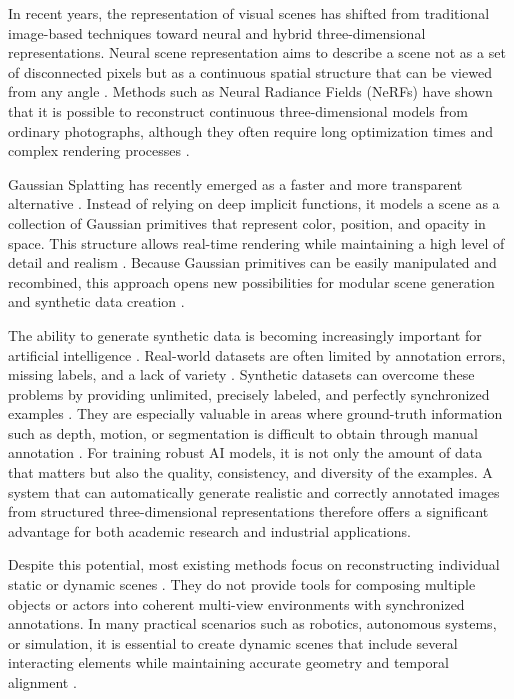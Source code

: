 In recent years, the representation of visual scenes has shifted from traditional image-based techniques toward neural and hybrid three-dimensional representations. Neural scene representation aims to describe a scene not as a set of disconnected pixels but as a continuous spatial structure that can be viewed from any angle \cite{mildenhall2021nerf}. Methods such as Neural Radiance Fields (NeRFs) have shown that it is possible to reconstruct continuous three-dimensional models from ordinary photographs, although they often require long optimization times and complex rendering processes \cite{barron2021mip}.

Gaussian Splatting has recently emerged as a faster and more transparent alternative \cite{kerbl3Dgaussians}. Instead of relying on deep implicit functions, it models a scene as a collection of Gaussian primitives that represent color, position, and opacity in space. This structure allows real-time rendering while maintaining a high level of detail and realism \cite{fridovich2023k}. Because Gaussian primitives can be easily manipulated and recombined, this approach opens new possibilities for modular scene generation and synthetic data creation \cite{CutAndSplat2024}.

The ability to generate synthetic data is becoming increasingly important for artificial intelligence \cite{tobin2017domain, denninger2019blenderproc}. Real-world datasets are often limited by annotation errors, missing labels, and a lack of variety \cite{dwibedi2017cutpaste}. Synthetic datasets can overcome these problems by providing unlimited, precisely labeled, and perfectly synchronized examples \cite{zanjani2025gaussian}. They are especially valuable in areas where ground-truth information such as depth, motion, or segmentation is difficult to obtain through manual annotation \cite{godard2017unsupervised, bertasius2019maskprop}.
For training robust AI models, it is not only the amount of data that matters but also the quality, consistency, and diversity of the examples. A system that can automatically generate realistic and correctly annotated images from structured three-dimensional representations therefore offers a significant advantage for both academic research and industrial applications.

Despite this potential, most existing methods focus on reconstructing individual static or dynamic scenes \cite{luiten2024dynamic,yang2024deformable}. They do not provide tools for composing multiple objects or actors into coherent multi-view environments with synchronized annotations. In many practical scenarios such as robotics, autonomous systems, or simulation, it is essential to create dynamic scenes that include several interacting elements while maintaining accurate geometry and temporal alignment \cite{CutAndSplat2024}. 

